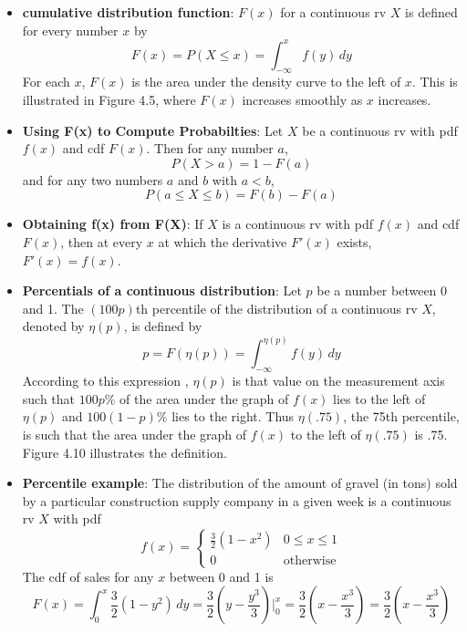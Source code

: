 \documentclass{report}
\begin{document}
\begin{itemize}
        \item \textbf{cumulative distribution function}: $F(x)$ for a continuous rv $X$ is defined for every number $x$ by
            \[
                F(x) = P(X \leq x) = \int_{-\infty}^{x} f(y) \, dy
            \]
        For each $x$, $F(x)$ is the area under the density curve to the left of $x$. This is illustrated in Figure 4.5, where $F(x)$ increases smoothly as $x$ increases.
    \item \textbf{Using F(x) to Compute Probabilties}:
        Let $X$ be a continuous rv with pdf $f(x)$ and cdf $F(x)$. Then for any number $a$,
        \[
            P(X > a) = 1 - F(a)
        \]
        and for any two numbers $a$ and $b$ with $a < b$,
        \[
            P(a \leq X \leq b) = F(b) - F(a)
        \]
    \item \textbf{Obtaining f(x) from F(X)}:
        If $X$ is a continuous rv with pdf $f(x)$ and cdf $F(x)$, then at every $x$ at which the derivative $F'(x)$ exists, $F'(x) = f(x)$.
    \item \textbf{Percentials of a continuous distribution}:
        Let $p$ be a number between 0 and 1. The $(100p)$th percentile of the distribution of a continuous rv $X$, denoted by $\eta(p)$, is defined by
        \[
            p = F(\eta(p)) = \int_{-\infty}^{\eta(p)} f(y) \, dy
        \]
        \bigbreak \noindent 
        According to this expression , $\eta(p)$ is that value on the measurement axis such that $100p\%$ of the area under the graph of $f(x)$ lies to the left of $\eta(p)$ and $100(1 - p)\%$ lies to the right. Thus $\eta(.75)$, the 75th percentile, is such that the area under the graph of $f(x)$ to the left of $\eta(.75)$ is .75. Figure 4.10 illustrates the definition.
        \bigbreak \noindent 
    \item \textbf{Percentile example}:
        The distribution of the amount of gravel (in tons) sold by a particular construction supply company in a given week is a continuous rv $X$ with pdf
        \[
            f(x) = 
            \begin{cases} 
                \frac{3}{2} (1 - x^2) & 0 \leq x \leq 1 \\ 
                0 & \text{otherwise} 
            \end{cases}
        \]
        The cdf of sales for any $x$ between 0 and 1 is
        \[
            F(x) = \int_{0}^{x} \frac{3}{2} (1 - y^2) \, dy = \frac{3}{2} \left( y - \frac{y^3}{3} \right) \bigg|_{0}^{x} = \frac{3}{2} \left( x - \frac{x^3}{3} \right) = \frac{3}{2} \left( x - \frac{x^3}{3} \right)
\]
\end{itemize}
\end{document}

